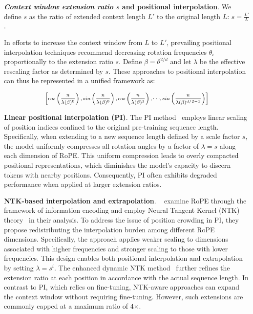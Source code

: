 \textbf{\emph{Context window extension ratio $s$} and positional interpolation}. We define $s$ as  the ratio of extended context length $L'$ to the original length $L$: $s=\frac{L'}{L}$. 

In efforts to increase the context window from $L$ to $L'$, prevailing positional interpolation techniques recommend decreasing rotation frequencies $\theta_i$ proportionally to the extension ratio $s$. Define $\beta=\theta^{2/d}$ and let $\lambda$ be the effective rescaling factor as determined by $s$. These approaches to positional interpolation can thus be represented in a unified framework as:

\begin{equation}	
	\fontsize{7.5}{7.5} \selectfont
	\label{eq:unified_rope}
	\begin{aligned}
		\left[cos\left(\frac{n}{\lambda(\beta)^0}\right), sin \left(\frac{n}{\lambda(\beta)^0}\right), cos\left(\frac{n}{\lambda(\beta)^1}\right), \cdot\cdot\cdot,  sin \left(\frac{n}{\lambda(\beta)^{d/2-1}}\right) \right]   
	\end{aligned}
\end{equation}

\textbf{Linear positional interpolation (PI)}. The PI method~\cite{pi} employs linear scaling of position indices confined to the original pre-training sequence length. Specifically, when extending to a new sequence length defined by a scale factor $s$, the model uniformly compresses all rotation angles by a factor of $\lambda=s$ along each dimension of RoPE. This uniform compression leads to overly compacted positional representations, which diminishes the model's capacity to discern tokens with nearby positions. Consequently, PI often exhibits degraded performance when applied at larger extension ratios.

\textbf{NTK-based interpolation and extrapolation}. ~\cite{ntk,dynamicntk} examine RoPE through the framework of information encoding and employ Neural Tangent Kernel (NTK) theory~\cite{jacot2018neural,tancik2020fourier} in their analysis. To address the issue of position crowding in PI, they propose redistributing the interpolation burden among different RoPE dimensions. Specifically, the approach applies weaker scaling to dimensions associated with higher frequencies and stronger scaling to those with lower frequencies. This design enables both positional interpolation and extrapolation by setting $\lambda=s^{i}$. The enhanced dynamic NTK method~\cite{dynamicntk} further refines the extension ratio at each position in accordance with the actual sequence length. In contrast to PI, which relies on fine-tuning, NTK-aware approaches can expand the context window without requiring fine-tuning. However, such extensions are commonly capped at a maximum ratio of 4$\times$.

